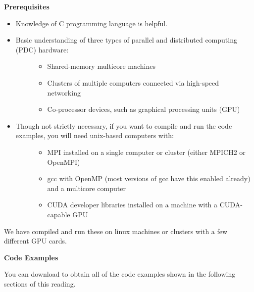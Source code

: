 \documentclass[letterpaper,10pt,openany,oneside]{sphinxmanual}
\begin{document}
\textbf{Prerequisites}
\begin{itemize}
\item {} 
Knowledge of C programming language is helpful.

\item {} \begin{description}
\item[{Basic understanding of three types of parallel and distributed computing (PDC) hardware:}] \leavevmode\begin{itemize}
\item {} 
Shared-memory multicore machines

\item {} 
Clusters of multiple computers connected via high-speed networking

\item {} 
Co-processor devices, such as graphical processing units (GPU)

\end{itemize}

\end{description}

\item {} \begin{description}
\item[{Though not strictly necessary, if you want to compile and run the code examples, you will need unix-based computers with:}] \leavevmode\begin{itemize}
\item {} 
MPI installed on a single computer or cluster (either MPICH2 or OpenMPI)

\item {} 
gcc with OpenMP (most versions of gcc have this enabled already) and a multicore computer

\item {} 
CUDA developer libraries installed on a machine with a CUDA-capable GPU

\end{itemize}

\end{description}

\end{itemize}

We have compiled and run these on linux machines or clusters with a few different GPU cards.

\textbf{Code Examples}

You can download  to obtain all of the code examples shown in the following sections of this reading.
\end{document}
